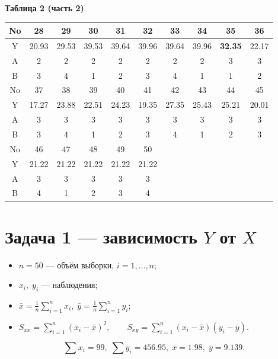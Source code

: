 \documentclass[areasetadvanced]{scrartcl}
\begin{document}
\begin{enumerate}
    \textbf{Таблица 2 (часть 2)}
    {\small
    \begin{longtable}{|c|*{9}{c|}}
    \hline
    No & 28 & 29 & 30 & 31 & 32 & 33 & 34 & 35 & 36 \\
    \hline
    Y  & 20.93 & 29.53 & 39.53 & 39.64 & 39.96 & 39.64 & 39.96 & \textbf{32.35} & 22.17 \\
    \hline
    A  & 2 & 2 & 2 & 2 & 2 & 2 & 2 & 3 & 3 \\
    \hline
    B  & 3 & 4 & 1 & 2 & 3 & 4 & 1 & 1 & 2 \\
    \hline
    No & 37 & 38 & 39 & 40 & 41 & 42 & 43 & 44 & 45 \\
    \hline
    Y  & 17.27 & 23.88 & 22.51 & 24.23 & 19.35 & 27.35 & 25.43 & 25.21 & 20.01 \\
    \hline
    A  & 3 & 3 & 3 & 3 & 3 & 3 & 3 & 3 & 3 \\
    \hline
    B  & 3 & 4 & 1 & 2 & 3 & 4 & 1 & 2 & 3 \\
    \hline
    No & 46 & 47 & 48 & 49 & 50 \\
    \hline
    Y  & 21.22 & 21.22 & 21.22 & 21.22 & 21.22 \\
    \hline
    A  & 3 & 3 & 3 & 3 & 3 \\
    \hline
    B  & 4 & 1 & 2 & 3 & 4 \\
    \hline
    \end{longtable}
    }    
\end{enumerate}
\newpage
\section{Задача 1 — зависимость \texorpdfstring{$Y$}{Y} от \texorpdfstring{$X$}{X}}
\vspace{-2mm}
\begin{itemize}[nosep]
  \item $n=50$ — объём выборки, $i=1,\dots,n$;
  \item $x_i,\;y_i$ — наблюдения;
  \item $\displaystyle\bar x=\frac1n\sum_{i=1}^n x_i,\;
        \bar y=\frac1n\sum_{i=1}^n y_i$;
  \item
    \(
      \displaystyle
      S_{xx}=\sum_{i=1}^n(x_i-\bar x)^2,\qquad
      S_{xy}=\sum_{i=1}^n(x_i-\bar x)(y_i-\bar y).
    \)
\end{itemize}

\[
\boxed{\sum x_i = 99},\;
\boxed{\sum y_i = 456.95},\;
\bar x = 1.98,\;
\bar y = 9.139.
\]
\end{document}
